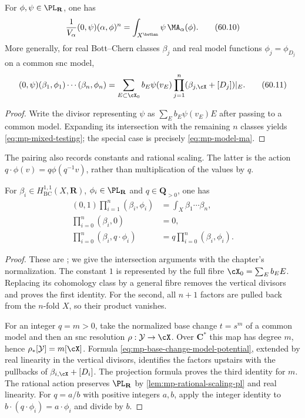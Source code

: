 \begin{samepage}
\begin{proposition}\label{prop:mp-ma-testing}
For $\phi,\psi\in\PL_{\mathbf R}$, one has
\[
 \frac1{V_\alpha}(0,\psi)(\alpha,\phi)^n
     =\int_{X^{\bethan}}\psi\,\MA_\alpha(\phi).
\tag{60.10}\label{eq:mp-ma-testing}
\]
More generally, for real Bott--Chern classes $\beta_j$ and real model functions $\phi_j=\phi_{D_j}$ on a common snc model,
\[
 (0,\psi)(\beta_1,\phi_1)\cdots(\beta_n,\phi_n)
 =\sum_{E\subset\cX_0}b_E\psi(v_E)
      \prod_{j=1}^n(\beta_{j,\cX}+[D_j])|_E .
\tag{60.11}\label{eq:mp-mixed-testing}
\]
\end{proposition}
\end{samepage}

\begin{proof}
Write the divisor representing $\psi$ as
$\sum_Eb_E\psi(v_E)E$ after passing to a common model.  Expanding its
intersection with the remaining $n$ classes yields
\eqref{eq:mp-mixed-testing}; the special case is precisely
\eqref{eq:mp-model-ma}.
\end{proof}

The pairing also records constants and rational scaling. The latter is the action $q\cdot\phi(v)=q\phi(q^{-1}v)$, rather than multiplication of the values by $q$.

\begin{proposition}\label{prop:mp-pairing-normalization}
For $\beta_i\in H^{1,1}_{\mathrm{BC}}(X,\mathbf R)$, $\phi_i\in\PL_{\mathbf R}$ and $q\in\mathbf Q_{>0}$, one has
\[
 \begin{aligned}
 (0,1)\prod_{i=1}^n(\beta_i,\phi_i)&=\int_X\beta_1\cdots\beta_n,\\
 \prod_{i=0}^n(\beta_i,0)&=0,\\
 \prod_{i=0}^n(\beta_i,q\cdot\phi_i)&=q\prod_{i=0}^n(\beta_i,\phi_i).
 \end{aligned}
\tag{60.11a}\label{eq:mp-pairing-normalization}
\]
\end{proposition}

\begin{proof}
These are \cite[Proposition~4.2.4(i)--(iii), p.~37]{MPTropicalV2}; we give the intersection arguments with the chapter's normalization. The constant $1$ is represented by the full fibre $\cX_0=\sum_Eb_EE$. Replacing its cohomology class by a general fibre removes the vertical divisors and proves the first identity. For the second, all $n+1$ factors are pulled back from the $n$-fold $X$, so their product vanishes.

For an integer $q=m>0$, take the normalized base change $t=s^m$ of a common model and then an snc resolution $\rho:\mathcal Y\to\cX$. Over $\mathbf C^*$ this map has degree $m$, hence $\rho_*[\mathcal Y]=m[\cX]$. Formula \eqref{eq:mp-base-change-model-potential}, extended by real linearity in the vertical divisors, identifies the factors upstairs with the pullbacks of $\beta_{i,\cX}+[D_i]$. The projection formula proves the third identity for $m$. The rational action preserves $\PL_{\mathbf R}$ by \cref{lem:mp-rational-scaling-pl} and real linearity. For $q=a/b$ with positive integers $a,b$, apply the integer identity to $b\cdot(q\cdot\phi_i)=a\cdot\phi_i$ and divide by $b$.
\end{proof}

